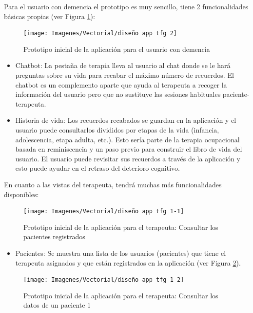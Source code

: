 Para el usuario con demencia el prototipo es muy sencillo, tiene 2 funcionalidades básicas propias (ver Figura \ref{fig:diseñoinicialappusuario}):

\begin{figure}[h]
	\centering
	\texttt{[image: Imagenes/Vectorial/diseño app tfg 2]}
	\caption{Prototipo inicial de la aplicación para el usuario con demencia}
	\label{fig:diseñoinicialappusuario}
\end{figure}

\begin{itemize}
	\item Chatbot: La pestaña de terapia lleva al usuario al chat donde se le hará preguntas sobre su vida para recabar el máximo número de recuerdos. El chatbot es un complemento aparte que ayuda al terapeuta a recoger la información del usuario pero que no sustituye las sesiones habituales paciente-terapeuta.
	\item Historia de vida: Los recuerdos recabados se guardan en la aplicación y el usuario puede consultarlos divididos por etapas de la vida (infancia, adolescencia, etapa adulta, etc.). Esto sería parte de la terapia ocupacional basada en reminiscencia y un paso previo para construir el libro de vida del usuario. El usuario puede revisitar sus recuerdos a través de la aplicación y esto puede ayudar en el retraso del deterioro cognitivo.
\end{itemize}

En cuanto a las vistas del terapeuta, tendrá muchas más funcionalidades disponibles:

\begin{figure}[h]
	\centering
	\texttt{[image: Imagenes/Vectorial/diseño app tfg 1-1]}
	\caption{Prototipo inicial de la aplicación para el terapeuta: Consultar los pacientes registrados}
	\label{fig:diseñoinicialappterapeuta1}
\end{figure}


\begin{itemize}
	\item Pacientes: Se muestra una lista de los usuarios (pacientes) que tiene el terapeuta asignados y que están registrados en la aplicación (ver Figura \ref{fig:diseñoinicialappterapeuta1}). 
\end{itemize}

\begin{figure}[h]
	\centering
	\texttt{[image: Imagenes/Vectorial/diseño app tfg 1-2]}
	\caption{Prototipo inicial de la aplicación para el terapeuta: Consultar los datos de un paciente 1}
	\label{fig:diseñoinicialappterapeuta2}
\end{figure}


